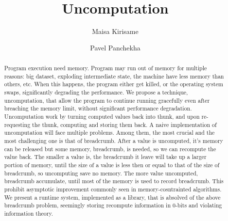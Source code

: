 \documentclass[acmsmall]{acmart}
\begin{document}
	\title{Uncomputation}
	\author{Maisa Kirisame}
	\authornotemark[1]

	\author{Pavel Panchekha}
	\email{}
	\authornotemark[1]
	
	\renewcommand{\shortauthors}{Kirisame et al.}
	\begin{abstract}
		Program execution need memory. Program may run out of memory for multiple reasons: big dataset, exploding intermediate state, the machine have less memory than others, etc. When this happens, the program either get killed, or the operating system swaps, significantly degrading the performance.
		We propose a technique, uncomputation, that allow the program to continue running gracefully even after breaching the memory limit, without significant performance degradation.
		Uncomputation work by turning computed values back into thunk, and upon re-requesting the thunk, computing and storing them back.
		A naive implementation of uncomputation will face multiple problems. Among them, the most crucial and the most challenging one is that of breadcrumb. After a value is uncomputed, it's memory can be released but some memory, breadcrumb, is needed, so we can recompute the value back.
		The smaller a value is, the breadcrumb it leave will take up a larger portion of memory, until the size of a value is less then or equal to that of the size of breadcrumb, so uncomputing save no memory.
		The more value uncomputed, breadcrumb accumulate, until most of the memory is used to record breadcrumb. This prohibit asymptotic improvement commonly seen in memory-cosntrainted algorithms.
		We present a runtime system, implemented as a library, that is absolved of the above breadcrumb problem, seemingly storing recompute information in 0-bits and violating information theory.
	\end{abstract}
	
\end{document}

